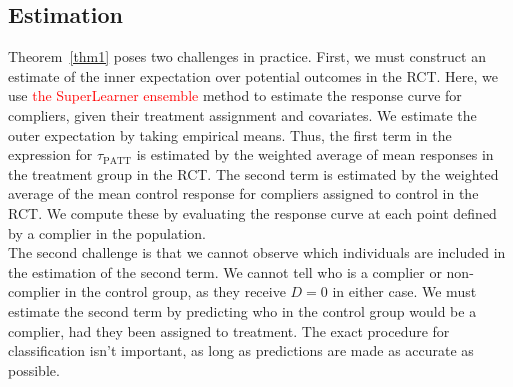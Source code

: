\documentclass{article}
\theoremstyle{plain}
\begin{document}
\subsection{Estimation}
Theorem~\ref{thm1} poses two challenges in practice.  First, we must construct an estimate of the inner expectation over potential outcomes in the RCT.  Here, we use \textcolor{red}{the SuperLearner ensemble} method to estimate the response curve for compliers, given their treatment assignment and covariates. We estimate the outer expectation by taking empirical means.  Thus, the first term in the expression for $\tau_{\text{PATT}}$ is estimated by the weighted average of mean responses in the treatment group in the RCT. The second term is estimated by the weighted average of the mean control response for compliers assigned to control in the RCT.  We compute these by evaluating the response curve at each point defined by a complier in the population.  \\

The second challenge is that we cannot observe which individuals are included in the estimation of the second term. We cannot tell who is a complier or non-complier in the control group, as they receive $D=0$ in either case.  We must estimate the second term by predicting who in the control group would be a complier, had they been assigned to treatment.  The exact procedure for classification isn't important, as long as predictions are made as accurate as possible. \\
\end{document}
